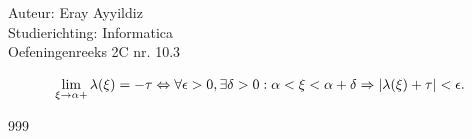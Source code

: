 \documentclass[a4paper]{article}
\begin{document}
  
\noindent \large Auteur: Eray Ayyildiz \\ 
\noindent \large Studierichting: Informatica \\ 
\noindent \large Oefeningenreeks 2C nr. 10.3 \\

\medskip

\normalsize

$$
\lim\limits_{\xi \to \alpha+} \lambda(\xi) = - \tau \Leftrightarrow \forall \epsilon > 0, \exists \delta > 0 : \alpha < \xi < \alpha + \delta \Rightarrow |\lambda(\xi) + \tau| < \epsilon. \\

$$

\begin{thebibliography}{999}
\end{thebibliography}
\end{document}
